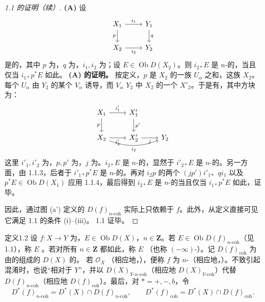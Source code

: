 \begin{proof}[ 1.1 的证明（续）]
\textbf{(A)} 设
\[
\begin{tikzcd}X_1\arrow[r,"i_1"]\arrow[d,"p"']&Y_1\arrow[d,"q"]\\X_2\arrow[r,"i_2"']&Y_2\end{tikzcd}
\]
是的，其中 $p$ 为，$q$ 为，$i_1,i_2$ 为；设 $E\in\operatorname{Ob}D(X_2)$。则 $i_{2*}E$ 是 $n$-的，当且仅当 $i_{1*}p^*E$ 如此。
\textbf{(A) 的证明。} 按定义，$p$ 是 $X_2$ 的一族 $U_\alpha$ 之和，这族 $X_2$。每个 $U_\alpha$ 由 $Y_2$ 的某个 $V_\alpha$ 诱导，而 $V_\alpha$  $Y_2$ 中 $X_2$ 的一个 $X'_2$。于是有，其中方块为：
\[
\begin{tikzcd}X_1\arrow[r,"i'_1"]\arrow[d,"p"']&X'_1\arrow[d,"p'"]&\\X_2\arrow[r,"i'_2"']\arrow[rr,bend right=20,"i_2"']&X'_2\arrow[r,"j"']&Y_2\end{tikzcd}
\]
这里 $i'_1,i'_2$ 为，$p,p'$ 为，$j$ 为。$i_{2*}E$ 是 $n$-的，显然于 $i'_{2*}E$ 是 $n$-的。另一方面，由 1.1.3，后者于 $i'_{1*}p^*E$ 是 $n$-的。再对 $i_2p$ 的两个 $(jp')i'_1$、$qi_1$ 以及 $p^*E\in\operatorname{Ob}D(X_1)$ 应用 1.1.4，最后得到 $i_{2*}E$ 是 $n$-的当且仅当 $i_{1*}p^*E$ 如此，证毕。

因此，通过图 (a') 定义的 $D(f)_{n\text{-coh}}$ 实际上只依赖于 $f$。此外，从定义直接可见它满足 1.1 的条件 (i)--(iii)。 1.1 证毕。
\end{proof}
\begin{SGAresult}{定义}{1.2}
设 $f:X\to Y$ 为，$E\in\operatorname{Ob}D(X)$，$n\in\mathbf Z$。若 $E\in\operatorname{Ob}D(f)_{n\text{-coh}}$（见 1.1），称 $E$ 。若对所有 $n\in\mathbf Z$ 都如此，称 $E$ （也称 $(-\infty)$-）。记 $D(f)_{\mathrm{coh}}$ 为由的组成的 $D(X)$ 的。
若 $\mathcal O_X$ （相应地，），便称 $f$ 为 $n$-（相应地，）。不致引起混淆时，也说“相对于 $Y$”，并以 $D(X)_{Y\text{-}n\text{-coh}}$（相应地 $D(X)_{Y\text{-coh}}$）代替 $D(f)_{n\text{-coh}}$（相应地 $D(f)_{\mathrm{coh}}$）。最后，对 $*=+,-,b$，令
\[
D^*(f)_{n\text{-coh}}=D^*(X)\cap D(f)_{n\text{-coh}},\qquad
D^*(f)_{\mathrm{coh}}=D^*(X)\cap D(f)_{\mathrm{coh}}.
\]
\end{SGAresult}
